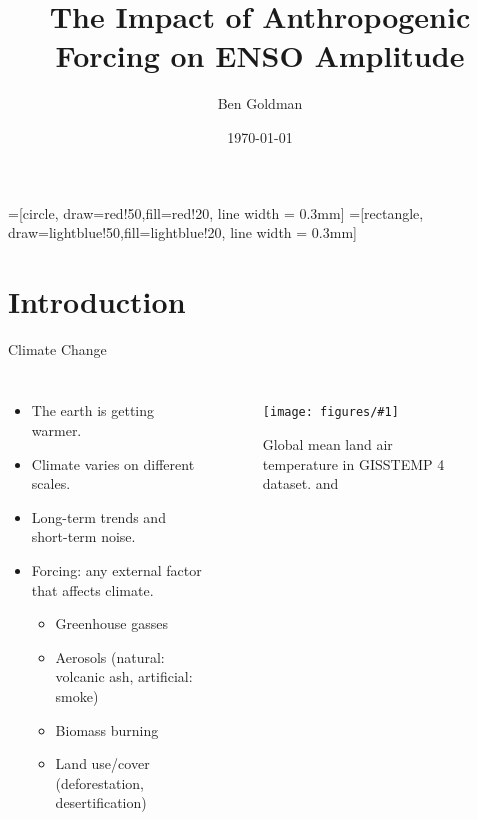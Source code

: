 \documentclass{beamer}
\title{The Impact of Anthropogenic Forcing on ENSO Amplitude}
\author{Ben Goldman}
\date{\today}
\newcommand{\myfig}[3]{
  \begin{figure}
    \centering
    \texttt{[image: figures/\#1]}
    \caption{#2}
    \label{fig:#3}
  \end{figure}
}
\begin{document}
  =[circle, draw=red!50,fill=red!20, line width = 0.3mm]
  =[rectangle, draw=lightblue!50,fill=lightblue!20, line width = 0.3mm]

\maketitle

\section{Introduction}

\begin{frame}{Climate Change}

  \begin{columns}
    \begin{itemize}
    \item The earth is getting warmer. \citep{pachauri2014climate}
    \item Climate varies on different scales.
    \item Long-term trends and short-term noise.
    \item \alert{Forcing}: any external factor that affects climate.
      \begin{itemize}
      \item Greenhouse gasses
      \item Aerosols (natural: volcanic ash, artificial: smoke)
      \item Biomass burning
      \item Land use/cover (deforestation, desertification)
      \end{itemize}
    \end{itemize}
    \myfig{intro_fig_3.pdf}{Global mean land air temperature in GISSTEMP 4 dataset. \citep{gistemp2019giss} and \citep{lenssen2019improvements}}{this}
  \end{columns}
\end{frame}
\end{document}
